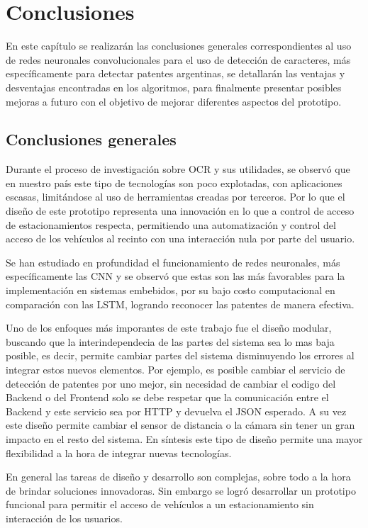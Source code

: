 \chapter{Conclusiones}
En este capítulo se realizarán las conclusiones generales correspondientes al uso de redes neuronales convolucionales para el uso de detección de caracteres, más específicamente para detectar patentes argentinas, se detallarán las ventajas y desventajas encontradas en los algoritmos, para finalmente presentar posibles mejoras a futuro con el objetivo de mejorar diferentes aspectos del prototipo.

\section{Conclusiones generales}

Durante el proceso de investigación sobre OCR y sus utilidades, se observó que en nuestro país este tipo de tecnologías son poco explotadas, con aplicaciones escasas, limitándose al uso de herramientas creadas por terceros.
Por lo que el diseño de este prototipo representa una innovación en lo que a control de acceso de estacionamientos respecta, permitiendo una automatización y control del acceso de los vehículos al recinto con una interacción nula por parte del usuario.

Se han estudiado en profundidad el funcionamiento de redes neuronales, más específicamente las CNN y se observó que estas son las más favorables para la implementación en sistemas embebidos, por su bajo costo computacional en comparación con las LSTM, logrando reconocer las patentes de manera efectiva.

Uno de los enfoques más imporantes de este trabajo fue el diseño modular, buscando que la interindependecia de las partes del sistema sea lo mas baja posible, es decir, permite cambiar partes del sistema disminuyendo los errores al integrar estos nuevos elementos.
Por ejemplo, es posible cambiar el servicio de detección de patentes por uno mejor, sin necesidad de cambiar el codigo del Backend o del Frontend solo se debe respetar que la comunicación entre el Backend y este servicio sea por HTTP y devuelva el JSON esperado.
A su vez este diseño permite cambiar el sensor de distancia o la cámara sin tener un gran impacto en el resto del sistema.
En síntesis este tipo de diseño permite una mayor flexibilidad a la hora de integrar nuevas tecnologías.

En general las tareas de diseño y desarrollo son complejas, sobre todo a la hora de brindar soluciones innovadoras.
Sin embargo se logró desarrollar un prototipo funcional para permitir el acceso de vehículos a un estacionamiento sin interacción de los usuarios.

